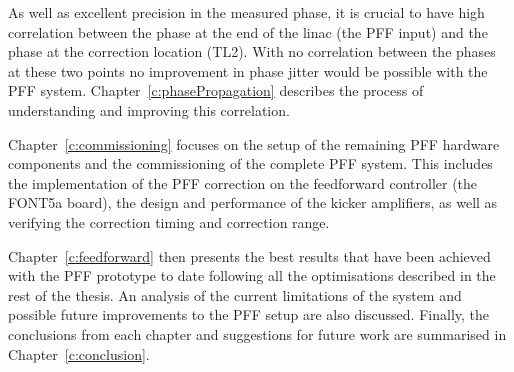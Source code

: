 As well as excellent precision in the measured phase, it is crucial to have high correlation between the phase at the end of the linac (the PFF input) and the phase at the correction location (TL2). With no correlation between the phases at these two points no improvement in phase jitter would be possible with the PFF system. Chapter~\ref{c:phasePropagation} describes the process of understanding and improving this correlation.

Chapter~\ref{c:commissioning} focuses on the setup of the remaining PFF hardware components and the commissioning of the complete PFF system. This includes the implementation of the PFF correction on the feedforward controller (the FONT5a board), the design and performance of the kicker amplifiers, as well as verifying the correction timing and correction range.

Chapter~\ref{c:feedforward} then presents the best results that have been achieved with the PFF prototype to date following all the optimisations described in the rest of the thesis. An analysis of the current limitations of the system and possible future improvements to the PFF setup are also discussed. Finally, the conclusions from each chapter and suggestions for future work are summarised in Chapter~\ref{c:conclusion}.

